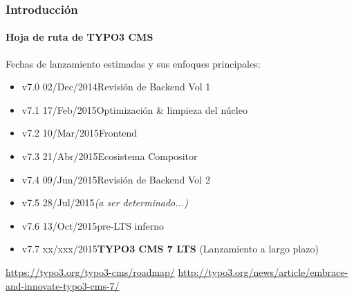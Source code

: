 
\begin{frame}[fragile]
	\frametitle{Introducción}
	\framesubtitle{Hoja de ruta de TYPO3 CMS}

	Fechas de lanzamiento estimadas y sus enfoques principales:

	\begin{itemize}
		\item
			\begingroup
				\color{typo3orange}
					v7.0 \textrightarrow\tabto{1.3cm}02/Dec/2014\tabto{3.4cm}Revisión de Backend Vol 1
			\endgroup

		\item v7.1 \textrightarrow\tabto{1.3cm}17/Feb/2015\tabto{3.4cm}Optimización \& limpieza del núcleo
		\item v7.2 \textrightarrow\tabto{1.3cm}10/Mar/2015\tabto{3.4cm}Frontend
		\item v7.3 \textrightarrow\tabto{1.3cm}21/Abr/2015\tabto{3.4cm}Ecosistema Compositor
		\item v7.4 \textrightarrow\tabto{1.3cm}09/Jun/2015\tabto{3.4cm}Revisión de Backend Vol 2
		\item v7.5 \textrightarrow\tabto{1.3cm}28/Jul/2015\tabto{3.4cm}\textit{(a ser determinado...)}
		\item v7.6 \textrightarrow\tabto{1.3cm}13/Oct/2015\tabto{3.4cm}pre-LTS inferno
		\item v7.7 \textrightarrow\tabto{1.3cm}xx/xxx/2015\tabto{3.4cm}\textbf{TYPO3 CMS 7 LTS} (Lanzamiento a largo plazo)
	\end{itemize}

	\smaller
		\url{https://typo3.org/typo3-cms/roadmap/}\newline
		\url{http://typo3.org/news/article/embrace-and-innovate-typo3-cms-7/}
	\normalsize

\end{frame}


